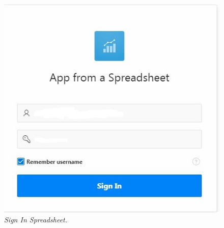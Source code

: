\begin{enumerate}
\begin{figure}
    \begin{center}
\includegraphics[scale=0.4]{figures/create5.jpg}
    \caption{\textit{Sign In Spreadsheet.}}
        \end{center}
\label{gambar}
\end{figure}

\end{enumerate}

